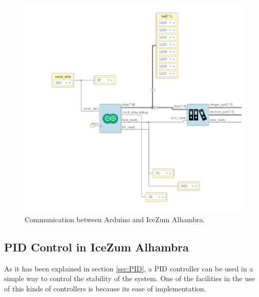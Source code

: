 \begin{figure}[H]
	\center
	\includegraphics[scale=0.4]{imagenes/Balancing_robot/arduino_arrange.PNG}
	\caption{Communication between Arduino and IceZum Alhambra.}
	\label{fig:arduino_arrange}
\end{figure}


\newpage

\subsection{PID Control in IceZum Alhambra}
As it has been explained in section \ref{sec:PID}, a PID controller can be used in a simple way to control the stability of the system. \newline
One of the facilities in the use of this kinds of controllers is because its ease of implementation.
